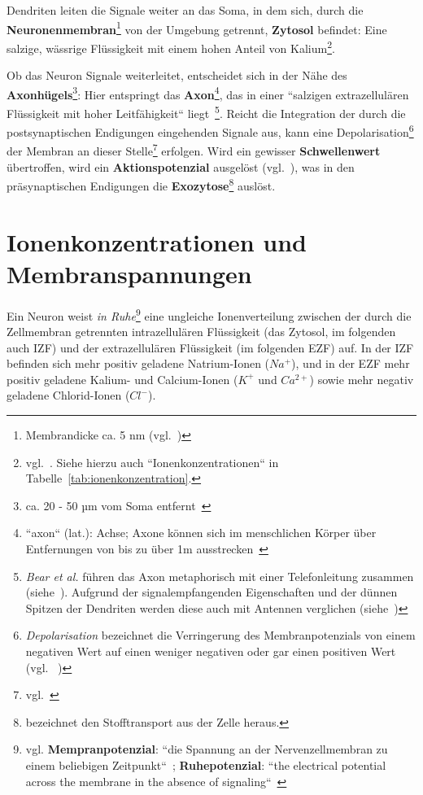 Dendriten leiten die Signale weiter an das Soma, in dem sich, durch die \textbf{Neuronenmembran}\footnote{
 Membrandicke ca. 5 nm (vgl.~\cite[66]{FE19})
} von der Umgebung getrennt, \textbf{Zytosol} befindet: Eine salzige, wässrige Flüssigkeit mit einem hohen Anteil von Kalium\footnote{vgl.~\cite[29]{BCP18}. Siehe hierzu auch ``Ionenkonzentrationen`` in Tabelle~\ref{tab:ionenkonzentration}.
}.

Ob das Neuron Signale weiterleitet, entscheidet sich in der Nähe des \textbf{Axonhügels}\footnote{
 ca. 20 - 50 µm vom Soma entfernt~\cite[77]{Jon19}
}: Hier entspringt das \textbf{Axon}\footnote{
 ``axon`` (lat.): Achse; Axone können sich im menschlichen Körper über Entfernungen von bis zu über 1m ausstrecken~\cite[28]{BCP18}
}, das in einer ``salzigen extrazellulären Flüssigkeit mit hoher Leitfähigkeit`` liegt~\cite[61]{BCP18}\footnote{
 \textit{Bear et al.} führen das Axon metaphorisch mit einer Telefonleitung zusammen (siehe~\cite[43]{BCP18}). Aufgrund der signalempfangenden Eigenschaften und der dünnen Spitzen der Dendriten werden diese auch mit Antennen verglichen (siehe~\cite[28]{BCP18})
}. Reicht die Integration der durch die postsynaptischen Endigungen eingehenden Signale aus, kann eine Depolarisation\footnote{
  \textit{Depolarisation} bezeichnet die Verringerung des Membranpotenzials von einem negativen Wert auf einen weniger negativen oder gar einen positiven Wert (vgl. ~\cite[95 f.]{SBB+13})
} der Membran an dieser Stelle\footnote{vgl.~\cite[61]{Eil19}} erfolgen. Wird ein gewisser \textbf{Schwellenwert} übertroffen, wird ein \textbf{Aktionspotenzial} ausgelöst (vgl.~\cite[142 f.]{BCP18}), was in den präsynaptischen Endigungen die \textbf{Exozytose}\footnote{
  bezeichnet den Stofftransport aus der Zelle heraus.
} auslöst.


\section{Ionenkonzentrationen und Membranspannungen}\label{sec-ionenkonzentrationen}

Ein Neuron weist \textit{in Ruhe}\footnote{
 vgl. \textbf{Mempranpotenzial}: ``die Spannung an der Nervenzellmembran zu einem beliebigen Zeitpunkt``~\cite[70]{BCP18}; \textbf{Ruhepotenzial}: ``the electrical potential across the membrane in the absence of signaling``~\cite[126]{KSJ+13}
} eine ungleiche Ionenverteilung zwischen der durch die Zellmembran getrennten intrazellulären Flüssigkeit (das Zytosol, im folgenden auch IZF) und der extrazellulären Flüssigkeit (im folgenden EZF) auf.
In der IZF befinden sich mehr positiv geladene Natrium-Ionen ($Na^+$), und in der EZF mehr positiv geladene Kalium- und Calcium-Ionen ($K^+$ und $Ca^{2+}$) sowie mehr negativ geladene Chlorid-Ionen ($Cl^-$).

